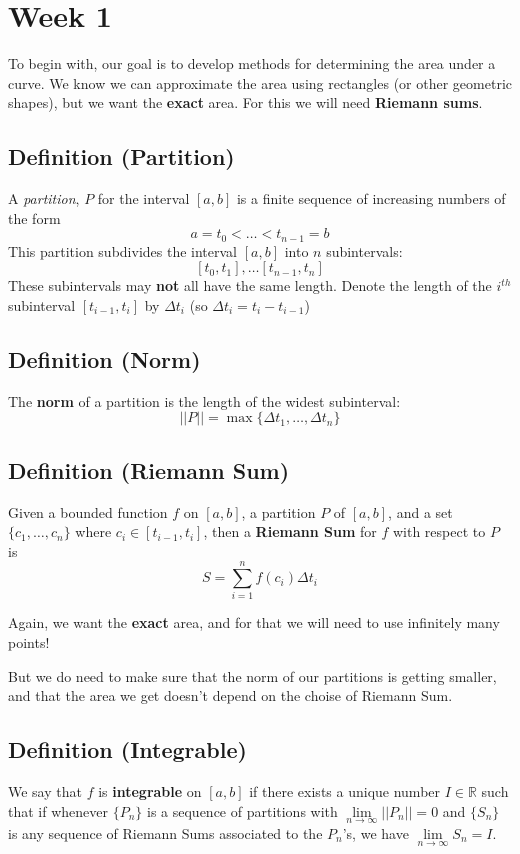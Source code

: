 \section{Week 1}
To begin with, our goal is to develop methods for determining the area under a curve.
We know we can approximate the area using rectangles (or other geometric shapes), but
we want the \textbf{exact} area. For this we will need \textbf{Riemann sums}.

\subsection{Definition (Partition)}
A \emph{partition}, $P$ for the interval $ [a,b] $ is a finite sequence of increasing
numbers of the form
\[ a=t_0<\dots <t_{n-1}=b \]
This partition subdivides the interval $ [a,b] $ into $ n $ subintervals:
\[ [t_0,t_1],\ldots [t_{n-1},t_n] \]
These subintervals may \textbf{not} all have the same length.
Denote the length of the $ i^{th} $ subinterval $ [t_{i-1},t_i] $ by $ \Delta t_i $
(so $ \Delta t_i=t_i-t_{i-1} $)

\subsection{Definition (Norm)}
The \textbf{norm} of a partition is the length of the widest subinterval:
\[ ||P||=\max\{\Delta t_1,\dots,\Delta t_{n}\} \]

\subsection{Definition (Riemann Sum)}
Given a bounded function $ f $ on $ [a,b] $, a partition $ P $ of $ [a,b] $, and a set
$ \{c_1,\dots,c_n\} $ where $ c_i\in[t_{i-1},t_i] $, then a \textbf{Riemann Sum} for
$f$ with respect to $ P $ is
\[ S=\sum\limits_{i=1}^{n} f(c_i)\Delta t_i \]

Again, we want the \textbf{exact} area, and for that we will need to use infinitely
many points!

But we do need to make sure that the norm of our partitions is getting smaller,
and that the area we get doesn't depend on the choise of Riemann Sum.

\subsection{Definition (Integrable)}
We say that $ f $ is \textbf{integrable} on $ [a,b] $ if there exists a unique number
$ I\in\mathbb{R} $ such that if whenever $ \{P_n\} $ is a sequence of partitions with
$ \lim\limits_{{n} \to {\infty}} ||P_n||=0 $ and $ \{S_n\} $ is any sequence of
Riemann Sums associated to the $ P_n $'s, we have $ \lim\limits_{{n} \to {\infty}} S_n=I $.

